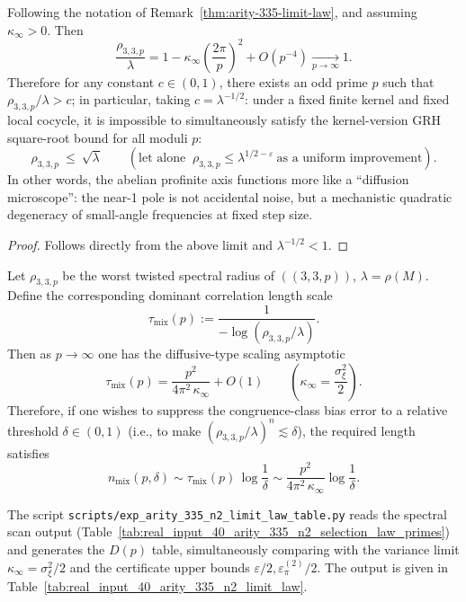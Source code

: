 \begin{corollary}\label{cor:arity-335-abelian-uniform-gap-nogo}
Following the notation of Remark~\ref{thm:arity-335-limit-law}, and assuming \(\kappa_\infty>0\).
Then
\[
\frac{\rho_{3,3,p}}{\lambda}
=
1-\kappa_\infty\left(\frac{2\pi}{p}\right)^2+O(p^{-4})
\xrightarrow[p\to\infty]{}1.
\]
Therefore for any constant \(c\in(0,1)\), there exists an odd prime \(p\) such that \(\rho_{3,3,p}/\lambda>c\);
in particular, taking \(c=\lambda^{-1/2}\): under a fixed finite kernel and fixed local cocycle, it is impossible to simultaneously satisfy the kernel-version GRH square-root bound for all moduli \(p\):
\[
\rho_{3,3,p}\ \le\ \sqrt{\lambda}
\qquad(\text{let alone }\ \rho_{3,3,p}\le \lambda^{1/2-\varepsilon}\ \text{as a uniform improvement}).
\]
In other words, the abelian profinite axis functions more like a ``diffusion microscope'': the near-1 pole is not accidental noise, but a mechanistic quadratic degeneracy of small-angle frequencies at fixed step size.
\end{corollary}
\begin{proof}
Follows directly from the above limit and \(\lambda^{-1/2}<1\).
\end{proof}

\begin{remark}\label{cor:arity-335-diffusive-mixing}
Let $\rho_{3,3,p}$ be the worst twisted spectral radius of $((3,3,p))$, $\lambda=\rho(M)$.
Define the corresponding dominant correlation length scale
\[
\tau_{\mathrm{mix}}(p):=\frac{1}{-\log(\rho_{3,3,p}/\lambda)}.
\]
Then as $p\to\infty$ one has the diffusive-type scaling asymptotic
\[
\tau_{\mathrm{mix}}(p)=\frac{p^2}{4\pi^2\,\kappa_\infty}+O(1)
\qquad\left(\kappa_\infty=\frac{\sigma_\xi^2}{2}\right).
\]
Therefore, if one wishes to suppress the congruence-class bias error to a relative threshold $\delta\in(0,1)$ (i.e., to make $(\rho_{3,3,p}/\lambda)^n\lesssim \delta$), the required length satisfies
\[
n_{\mathrm{mix}}(p,\delta)
\sim
\tau_{\mathrm{mix}}(p)\,\log\frac{1}{\delta}
\sim
\frac{p^2}{4\pi^2\,\kappa_\infty}\log\frac{1}{\delta}.
\]
\end{remark}

\begin{remark}\label{rem:arity-335-limit-law-table}
The script \texttt{scripts/exp\_arity\_335\_n2\_limit\_law\_table.py} reads the spectral scan output (Table~\ref{tab:real_input_40_arity_335_n2_selection_law_primes}) and generates the \(D(p)\) table, simultaneously comparing with the variance limit \(\kappa_\infty=\sigma_\xi^2/2\) and the certificate upper bounds \(\varepsilon/2,\varepsilon_\pi^{(2)}/2\). The output is given in Table~\ref{tab:real_input_40_arity_335_n2_limit_law}.
\end{remark}

